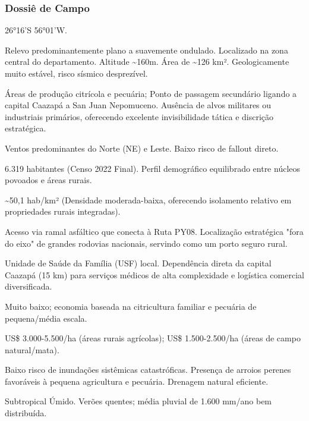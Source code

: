 \subsubsection{Dossiê de Campo}
\begin{description}[style=nextline,leftmargin=0.5cm,font=\bfseries]
\item[Coordenadas]  26°16'S 56°01'W.
\item[Topografia]  Relevo predominantemente plano a suavemente ondulado. Localizado na zona central do departamento. Altitude \textasciitilde 160m. Área de \textasciitilde 126 km². Geologicamente muito estável, risco sísmico desprezível.
\item[Alvos Estratégicos]  Áreas de produção citrícola e pecuária; Ponto de passagem secundário ligando a capital Caazapá a San Juan Nepomuceno. Ausência de alvos militares ou industriais primários, oferecendo excelente invisibilidade tática e discrição estratégica.
\item[Fallout]  Ventos predominantes do Norte (NE) e Leste. Baixo risco de fallout direto.
\item[População]  6.319 habitantes (Censo 2022 Final). Perfil demográfico equilibrado entre núcleos povoados e áreas rurais.
\item[Densidade]  \textasciitilde 50,1 hab/\allowbreak km² (Densidade moderada-baixa, oferecendo isolamento relativo em propriedades rurais integradas).
\item[Vias de Acesso]  Acesso via ramal asfáltico que conecta à Ruta PY08. Localização estratégica "fora do eixo" de grandes rodovias nacionais, servindo como um porto seguro rural.
\item[Serviços]  Unidade de Saúde da Família (USF) local. Dependência direta da capital Caazapá (15 km) para serviços médicos de alta complexidade e logística comercial diversificada.
\item[Custo de Vida]  Muito baixo; economia baseada na citricultura familiar e pecuária de pequena/\allowbreak média escala.
\item[Preço da Terra]  US\$ 3.000-5.500/\allowbreak ha (áreas rurais agrícolas); US\$ 1.500-2.500/\allowbreak ha (áreas de campo natural/\allowbreak mata).
\item[Hidrologia]  Baixo risco de inundações sistêmicas catastróficas. Presença de arroios perenes favoráveis à pequena agricultura e pecuária. Drenagem natural eficiente.
\item[Clima]  Subtropical Úmido. Verões quentes; média pluvial de 1.600 mm/\allowbreak ano bem distribuída.

\end{description}
